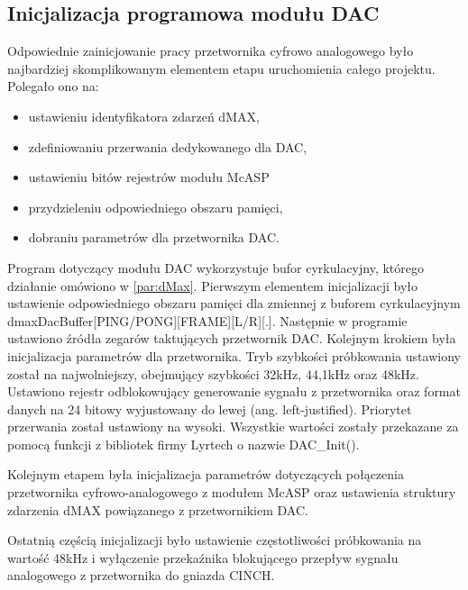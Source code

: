 \subsection{Inicjalizacja programowa modułu DAC}
Odpowiednie zainicjowanie pracy przetwornika cyfrowo analogowego było najbardziej skomplikowanym elementem etapu uruchomienia całego projektu. Polegało ono na:
\begin{itemize}
\item ustawieniu identyfikatora zdarzeń dMAX, 
\item zdefiniowaniu przerwania dedykowanego dla DAC, 
\item ustawieniu bitów rejestrów modułu McASP
\item przydzieleniu odpowiedniego obszaru pamięci,
\item dobraniu parametrów dla przetwornika DAC.
\end{itemize}

Program dotyczący modułu DAC wykorzystuje bufor cyrkulacyjny, którego działanie omówiono w \ref{par:dMax}. Pierwszym elementem inicjalizacji było ustawienie odpowiedniego obszaru pamięci dla zmiennej z buforem cyrkulacyjnym dmaxDacBuffer[PING/PONG][FRAME][L/R][.]. Następnie w programie ustawiono źródła zegarów taktujących przetwornik DAC. Kolejnym krokiem była inicjalizacja parametrów dla przetwornika. Tryb szybkości próbkowania ustawiony został na najwolniejszy, obejmujący szybkości 32kHz, 44,1kHz oraz 48kHz. Ustawiono rejestr odblokowujący generowanie sygnału z przetwornika oraz format danych na 24 bitowy wyjustowany do lewej (ang. left-justified). 
Priorytet przerwania został ustawiony na wysoki. Wszystkie wartości zostały przekazane za pomocą funkcji z bibliotek firmy Lyrtech o nazwie DAC\_Init().


Kolejnym etapem była inicjalizacja parametrów dotyczących połączenia przetwornika cyfrowo-analogowego z modułem McASP oraz ustawienia struktury zdarzenia dMAX powiązanego z przetwornikiem DAC. 

Ostatnią częścią inicjalizacji było ustawienie częstotliwości próbkowania na wartość 48kHz i wyłączenie przekaźnika blokującego przepływ sygnału analogowego z przetwornika do gniazda CINCH.


